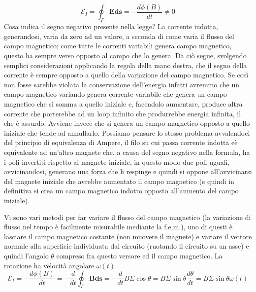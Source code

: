 \documentclass[
10pt, %
a4paper, %
oneside, %
headinclude,footinclude, %
BCOR5mm, %
]{scrartcl}
\begin{document}
\[\mathcal{E}_I = \oint_{\Gamma}\mathbf{E}\mathbf{ds}=-\frac{d\phi(B)}{dt}\neq 0\]
Cosa indica il segno negativo presente nella legge? La corrente indotta, generandosi, varia da zero ad un valore, a seconda di come varia il flusso del campo magnetico; come tutte le correnti variabili genera campo magnetico, questo ha sempre verso opposto al campo che lo genera. Da ciò segue, svolgendo semplici considerazioni applicando la regola della mano destra, che il segno della corrente è sempre opposto a quello della variazione del campo magnetico.  Se così non fosse sarebbe violata la conservazione dell'energia infatti avremmo che un campo magnetico variando genera corrente variabile che genera un campo magnetico che si somma a quello iniziale e, facendolo aumentare, produce altra corrente che porterebbe ad un loop infinito che produrrebbe energia infinita, il che è assurdo. Avviene invece che si genera un campo magnetico opposto a quello iniziale che tende ad annullarlo. Possiamo pensare lo stesso problema avvalendoci del principio di equivalenza di Ampere, il filo su cui passa corrente indotta eè equivalente ad un'altro magnete che, a causa del segno negativo nella formula, ha i poli invertiti rispetto al magnete iniziale, in questo modo due poli uguali, avvicinandosi, generano una forza che li respinge e quindi si oppone all'avvicinarsi del magnete iniziale che avrebbe aumentato il campo magnetico  (e quindi in definitiva si crea un campo magnetico indotto opposto all'aumento del campo iniziale).
\begin{esercizio}
Vi sono vari metodi per far variare il flusso del campo magnetico (la variazione di flusso nel tempo è facilmente misurabile mediante la f.e.m.), uno di questi è lasciare il campo magnetico costante (non muovere il magnete) e variare il vettore normale alla superficie individuata dal circuito (ruotando il circuito su un asse) e quindi l'angolo $\theta$ compreso fra questo versore ed il campo magnetico. La rotazione ha velocità angolare $\omega(t)$
\[\mathcal{E}_I = -\frac{d\phi (B)}{dt} = -\frac{d}{dt}\oint_{\Gamma}\mathbf{B}\mathbf{ds} = -\frac{d}{dt}B\Sigma \cos\theta=B\Sigma \sin\theta\frac{d\theta}{dt}=B\Sigma\sin\theta\omega(t)\]
\end{esercizio}
\end{document}
